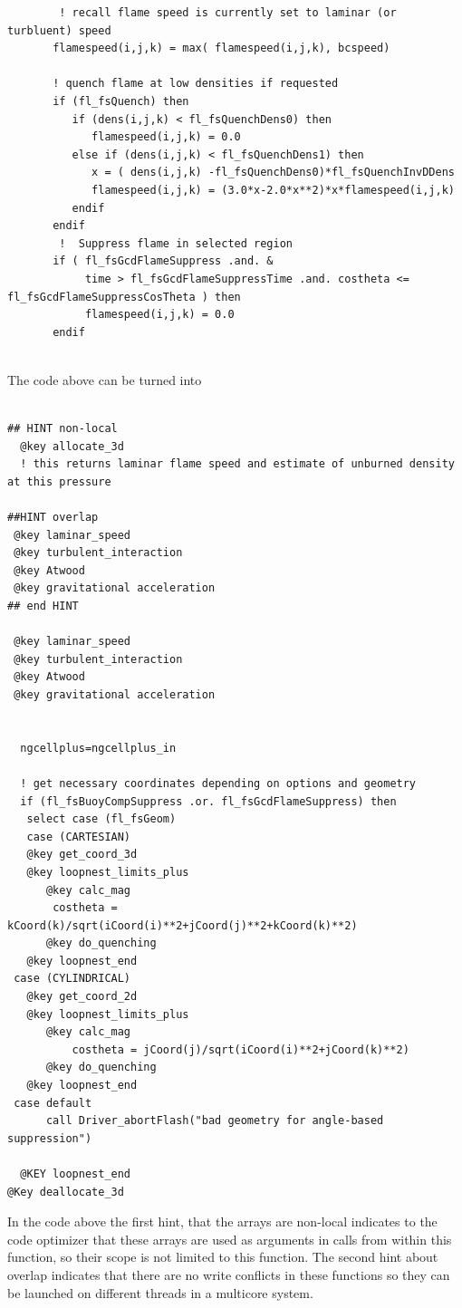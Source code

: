 \documentclass{article}
\begin{document}
\begin{verbatim}
        ! recall flame speed is currently set to laminar (or turbluent) speed
       flamespeed(i,j,k) = max( flamespeed(i,j,k), bcspeed)

       ! quench flame at low densities if requested
       if (fl_fsQuench) then
          if (dens(i,j,k) < fl_fsQuenchDens0) then
             flamespeed(i,j,k) = 0.0
          else if (dens(i,j,k) < fl_fsQuenchDens1) then
             x = ( dens(i,j,k) -fl_fsQuenchDens0)*fl_fsQuenchInvDDens
             flamespeed(i,j,k) = (3.0*x-2.0*x**2)*x*flamespeed(i,j,k)
          endif
       endif
        !  Suppress flame in selected region
       if ( fl_fsGcdFlameSuppress .and. &
            time > fl_fsGcdFlameSuppressTime .and. costheta <= fl_fsGcdFlameSuppressCosTheta ) then
            flamespeed(i,j,k) = 0.0
       endif


\end{verbatim}


The code above can be turned into
\begin{verbatim}

## HINT non-local
  @key allocate_3d
  ! this returns laminar flame speed and estimate of unburned density
at this pressure

##HINT overlap
 @key laminar_speed
 @key turbulent_interaction
 @key Atwood
 @key gravitational acceleration
## end HINT

 @key laminar_speed
 @key turbulent_interaction
 @key Atwood
 @key gravitational acceleration


  ngcellplus=ngcellplus_in

  ! get necessary coordinates depending on options and geometry
  if (fl_fsBuoyCompSuppress .or. fl_fsGcdFlameSuppress) then
   select case (fl_fsGeom)
   case (CARTESIAN)
   @key get_coord_3d
   @key loopnest_limits_plus
      @key calc_mag
       costheta = kCoord(k)/sqrt(iCoord(i)**2+jCoord(j)**2+kCoord(k)**2)
      @key do_quenching
   @key loopnest_end
 case (CYLINDRICAL)
   @key get_coord_2d
   @key loopnest_limits_plus
      @key calc_mag
          costheta = jCoord(j)/sqrt(iCoord(i)**2+jCoord(k)**2)
      @key do_quenching
   @key loopnest_end
 case default
      call Driver_abortFlash("bad geometry for angle-based suppression")

  @KEY loopnest_end
@Key deallocate_3d
\end{verbatim}

In the code above the first hint, that the arrays are non-local
indicates to the code optimizer that these arrays are used as
arguments in calls from within this function, so their scope is not
limited to this function. The second hint about overlap indicates that
there are no write conflicts in these functions so they can be
launched on different threads in a multicore system.
\end{document}
